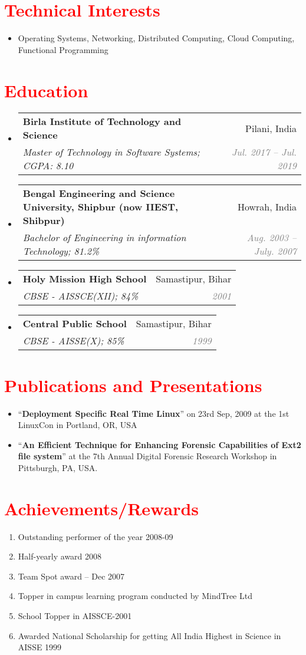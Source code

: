 \documentclass[letterpaper,11pt]{article}
\makeatletter
\newcommand{\resumeSubheading}[4]{
  \vspace{-1pt}\item
    \begin{tabular*}{0.97\textwidth}[t]{l@{\extracolsep{\fill}}r}
      \textbf{#1} & #2 \\
      \textit{\small#3} & \textit{\small #4} \\
    \end{tabular*}\vspace{-5pt}
}
\newcommand{\resumeSubHeadingListStart}{\begin{itemize}[leftmargin=*]}
\newcommand{\resumeSubHeadingListEnd}{\end{itemize}}
\makeatother
\begin{document}
\section{\textcolor{RED}{Technical Interests}}
\resumeSubHeadingListStart
    \item{Operating Systems, Networking, Distributed Computing, Cloud Computing, Functional Programming}
    \resumeSubHeadingListEnd

\section{\textcolor{RED}{Education}}
  \resumeSubHeadingListStart
    \resumeSubheading
      {Birla Institute of Technology and Science}{\textcolor{RED1}{Pilani, India}}
      {Master of Technology in Software Systems;  CGPA: 8.10}{\textcolor{GRAY}{Jul. 2017 -- Jul. 2019}}
    \resumeSubheading
      {Bengal Engineering and Science University, Shipbur (now IIEST, Shibpur)}{\textcolor{RED1}{Howrah, India}}
      {Bachelor of Engineering in information Technology;  81.2\% }{\textcolor{GRAY}{Aug. 2003 -- July. 2007}}
      \resumeSubheading
      {Holy Mission High School}{\textcolor{RED1}{Samastipur, Bihar}}
      {CBSE - AISSCE(XII); 84\%}{\textcolor{GRAY}{2001}}
      \resumeSubheading
      {Central Public School}{\textcolor{RED1}{Samastipur, Bihar}}
      {CBSE - AISSE(X); 85\%}{\textcolor{GRAY}{1999}}
  \resumeSubHeadingListEnd

\section{\textcolor{RED}{Publications and Presentations}}
  \resumeSubHeadingListStart
    \item {“\textbf{Deployment Specific Real Time Linux}” on 23rd Sep, 2009 at the 1st LinuxCon in Portland, OR, USA}
    \item  {“\textbf{An Efficient Technique for Enhancing Forensic Capabilities of Ext2 file system}” at the 7th Annual Digital Forensic Research Workshop in Pittsburgh, PA, USA.}
  \resumeSubHeadingListEnd
  
  

\section{\textcolor{RED}{Achievements/Rewards}}
  \begin{enumerate}
    \item {Outstanding performer of the year 2008-09}
    \item {Half-yearly award 2008}
    \item{Team Spot award – Dec 2007}
    \item{Topper in campus learning program conducted by MindTree Ltd}
    \item{School Topper in AISSCE-2001}
    \item{Awarded National Scholarship for getting All India Highest in Science in AISSE 1999}  
    \end{enumerate}


\end{document}
